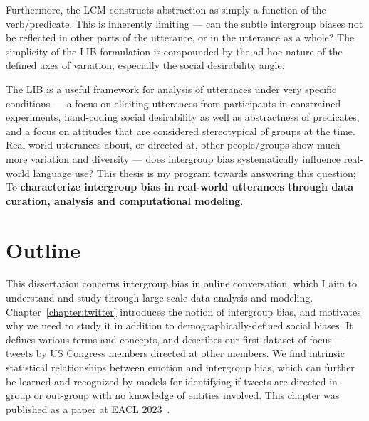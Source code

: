 Furthermore, the LCM constructs abstraction as simply a function of the verb/predicate. This is inherently limiting --- can the subtle intergroup biases not be reflected in other parts of the utterance, or in the utterance as a whole? The simplicity of the LIB formulation is compounded by the ad-hoc nature of the defined axes of variation, especially the social desirability angle. 

The LIB is a useful framework for analysis of utterances under very specific conditions --- a focus on eliciting utterances from participants in constrained experiments, hand-coding social desirability as well as abstractness of predicates, and a focus on attitudes that are considered stereotypical of groups at the time. Real-world utterances about, or directed at, other people/groups show much more variation and diversity --- does intergroup bias systematically influence real-world language use? This thesis is my program towards answering this question; To \textbf{characterize intergroup bias in real-world utterances through data curation, analysis and computational modeling}.

\section{Outline}

This dissertation concerns intergroup bias in online conversation, which I aim to understand and study through large-scale data analysis and modeling. Chapter~\ref{chapter:twitter} introduces the notion of intergroup bias, and motivates why we need to study it in addition to demographically-defined social biases. It defines various terms and concepts, and describes our first dataset of focus --- tweets by US Congress members directed at other members. We find intrinsic statistical relationships between emotion and intergroup bias, which can further be learned and recognized by models for identifying if tweets are directed in-group or out-group with no knowledge of entities involved. This chapter was published as a paper at EACL 2023~\citep{govindarajan-etal-2023-people}. 

